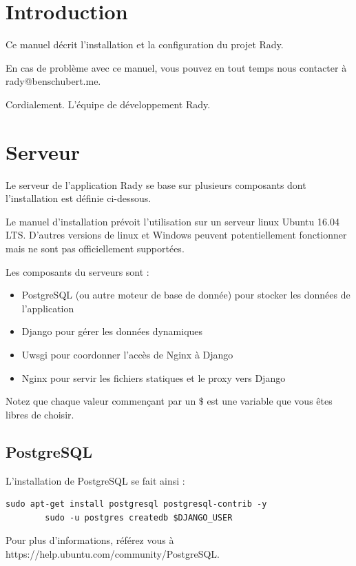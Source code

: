 \documentclass[french]{article}
\begin{document}
	\newpage	
	\section{Introduction}
	Ce manuel décrit l'installation et la configuration du projet Rady.
	
	En cas de problème avec ce manuel, vous pouvez en tout temps nous contacter à rady@benschubert.me.

	Cordialement.
	\newline
	L'équipe de développement Rady.
		
	\section{Serveur}

	Le serveur de l'application Rady se base sur plusieurs composants dont l'installation est définie ci-dessous.
	
	Le manuel d'installation prévoit l'utilisation sur un serveur linux Ubuntu 16.04 LTS. D'autres versions de linux et Windows peuvent potentiellement fonctionner mais ne sont pas officiellement supportées.
	
	Les composants du serveurs sont :
	
	\begin{itemize}
		\item PostgreSQL (ou autre moteur de base de donnée) pour stocker les données de l'application
		\item Django pour gérer les données dynamiques
		\item Uwsgi pour coordonner l'accès de Nginx à Django
		\item Nginx pour servir les fichiers statiques et le proxy vers Django
	\end{itemize}

	Notez que chaque valeur commençant par un $\$$ est une variable que vous êtes libres de choisir.
	
	\subsection{PostgreSQL}
	
	L'installation de PostgreSQL se fait ainsi :
	
	\begin{lstlisting}[style=py]
		sudo apt-get install postgresql postgresql-contrib -y
		sudo -u postgres createdb $DJANGO_USER
	\end{lstlisting}
	
	Pour plus d'informations, référez vous à https://help.ubuntu.com/community/PostgreSQL.
	
\end{document}
